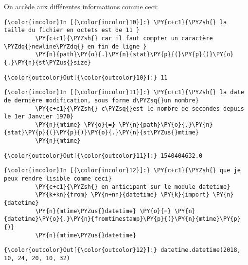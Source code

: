 On accède aux différentes informations comme ceci:

    \begin{Verbatim}[commandchars=\\\{\}]
{\color{incolor}In [{\color{incolor}10}]:} \PY{c+c1}{\PYZsh{} la taille du fichier en octets est de 11 }
         \PY{c+c1}{\PYZsh{} car il faut compter un caractère \PYZdq{}newline\PYZdq{} en fin de ligne }
         \PY{n}{path}\PY{o}{.}\PY{n}{stat}\PY{p}{(}\PY{p}{)}\PY{o}{.}\PY{n}{st\PYZus{}size}
\end{Verbatim}


\begin{Verbatim}[commandchars=\\\{\}]
{\color{outcolor}Out[{\color{outcolor}10}]:} 11
\end{Verbatim}
            
    \begin{Verbatim}[commandchars=\\\{\}]
{\color{incolor}In [{\color{incolor}11}]:} \PY{c+c1}{\PYZsh{} la date de dernière modification, sous forme d\PYZsq{}un nombre}
         \PY{c+c1}{\PYZsh{} c\PYZsq{}est le nombre de secondes depuis le 1er Janvier 1970}
         \PY{n}{mtime} \PY{o}{=} \PY{n}{path}\PY{o}{.}\PY{n}{stat}\PY{p}{(}\PY{p}{)}\PY{o}{.}\PY{n}{st\PYZus{}mtime}
         \PY{n}{mtime}
\end{Verbatim}


\begin{Verbatim}[commandchars=\\\{\}]
{\color{outcolor}Out[{\color{outcolor}11}]:} 1540404632.0
\end{Verbatim}
            
    \begin{Verbatim}[commandchars=\\\{\}]
{\color{incolor}In [{\color{incolor}12}]:} \PY{c+c1}{\PYZsh{} que je peux rendre lisible comme ceci}
         \PY{c+c1}{\PYZsh{} en anticipant sur le module datetime}
         \PY{k+kn}{from} \PY{n+nn}{datetime} \PY{k}{import} \PY{n}{datetime}
         \PY{n}{mtime\PYZus{}datetime} \PY{o}{=} \PY{n}{datetime}\PY{o}{.}\PY{n}{fromtimestamp}\PY{p}{(}\PY{n}{mtime}\PY{p}{)}
         \PY{n}{mtime\PYZus{}datetime}
\end{Verbatim}


\begin{Verbatim}[commandchars=\\\{\}]
{\color{outcolor}Out[{\color{outcolor}12}]:} datetime.datetime(2018, 10, 24, 20, 10, 32)
\end{Verbatim}
            
